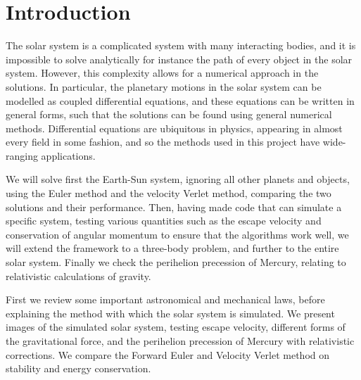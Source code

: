 \documentclass[../main.tex]{subfiles}
\begin{document}
\section{Introduction}\label{sec:introduction}


The solar system is a complicated system with many interacting bodies, and it is impossible to solve analytically for instance the path of every object in the solar system. However, this complexity allows for a numerical approach in the solutions. In particular, the planetary motions in the solar system can be modelled as coupled differential equations, and these equations can be written in general forms, such that the solutions can be found using general numerical methods. Differential equations are ubiquitous in physics, appearing in almost every field in some fashion, and so the methods used in this project have wide-ranging applications.

We will solve first the Earth-Sun system, ignoring all other planets and objects, using the Euler method and the velocity Verlet method, comparing the two solutions and their performance. Then, having made code that can simulate a specific system, testing various quantities such as the escape velocity and conservation of angular momentum to ensure that the algorithms work well, we will extend the framework to a three-body problem, and further to the entire solar system. Finally we check the perihelion precession of Mercury, relating to relativistic calculations of gravity.


First we review some important astronomical and mechanical laws, before explaining the method with which the solar system is simulated. We present images of the simulated solar system, testing escape velocity, different forms of the gravitational force, and the perihelion precession of Mercury with relativistic corrections. We compare the Forward Euler and Velocity Verlet method on stability and energy conservation.
\end{document}
